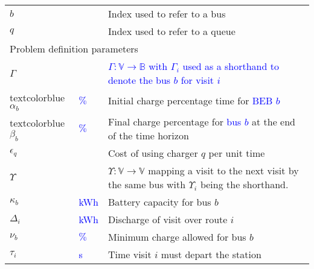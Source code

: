 \documentclass[utf8]{FrontiersinHarvard}
\begin{document}
\begin{table}[!htpb]
\begin{tabularx}{\textwidth}{l l l}
    $b$                      &                         & Index used to refer to a bus                                                                                      \\
    $q$                      &                         & Index used to refer to a queue                                                                                    \\
    \hline \multicolumn{3}{l}{Problem definition parameters}                                                                                                               \\
    \hline $\Gamma$               &                         & \textcolor{blue}{$\Gamma: \mathbb{V} \rightarrow \mathbb{B}$ with $\Gamma_i$ used as a shorthand to denote the bus $b$ for visit $i$} \\
    textcolor{blue}{$\alpha_b$}   & \textcolor{blue}{$\%$}  & Initial charge percentage time for \textcolor{blue}{BEB $b$}                                                      \\
    textcolor{blue}{$\beta_b$}   & \textcolor{blue}{$\%$}  & Final charge percentage for \textcolor{blue}{bus $b$} at the end of the time horizon                              \\
    $\epsilon_q$                    &                         & Cost of using charger $q$ per unit time                                                                           \\
    $\Upsilon$                      &                         & $\Upsilon: \mathbb{V} \rightarrow \mathbb{V}$ mapping a visit to the
    next visit by the same bus with $\Upsilon_i$ being the shorthand.                                                                                                             \\
    $\kappa_b$                    & \textcolor{blue}{kWh}   & Battery capacity for bus $b$                                                                                      \\
    $\Delta_i$                    & \textcolor{blue}{kWh}   & Discharge of visit over route $i$                                                                                 \\
    $\nu_b$                    & \textcolor{blue}{$\%$}  & Minimum charge allowed for bus $b$                                                                                \\
    $\tau_i$                    & \textcolor{blue}{s}     & Time visit $i$ must depart the station                                                                            \\

\end{tabularx}
\end{table}
\end{document}
